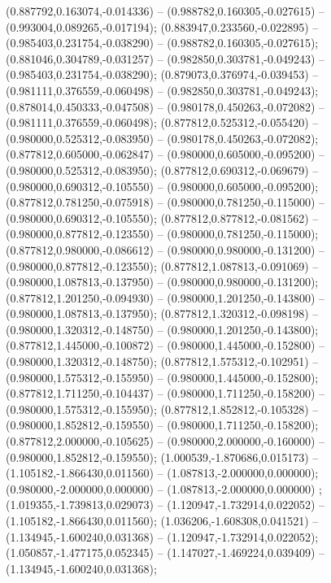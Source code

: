  (0.887792,0.163074,-0.014336) -- (0.988782,0.160305,-0.027615) -- (0.993004,0.089265,-0.017194);
 (0.883947,0.233560,-0.022895) -- (0.985403,0.231754,-0.038290) -- (0.988782,0.160305,-0.027615);
 (0.881046,0.304789,-0.031257) -- (0.982850,0.303781,-0.049243) -- (0.985403,0.231754,-0.038290);
 (0.879073,0.376974,-0.039453) -- (0.981111,0.376559,-0.060498) -- (0.982850,0.303781,-0.049243);
 (0.878014,0.450333,-0.047508) -- (0.980178,0.450263,-0.072082) -- (0.981111,0.376559,-0.060498);
 (0.877812,0.525312,-0.055420) -- (0.980000,0.525312,-0.083950) -- (0.980178,0.450263,-0.072082);
 (0.877812,0.605000,-0.062847) -- (0.980000,0.605000,-0.095200) -- (0.980000,0.525312,-0.083950);
 (0.877812,0.690312,-0.069679) -- (0.980000,0.690312,-0.105550) -- (0.980000,0.605000,-0.095200);
 (0.877812,0.781250,-0.075918) -- (0.980000,0.781250,-0.115000) -- (0.980000,0.690312,-0.105550);
 (0.877812,0.877812,-0.081562) -- (0.980000,0.877812,-0.123550) -- (0.980000,0.781250,-0.115000);
 (0.877812,0.980000,-0.086612) -- (0.980000,0.980000,-0.131200) -- (0.980000,0.877812,-0.123550);
 (0.877812,1.087813,-0.091069) -- (0.980000,1.087813,-0.137950) -- (0.980000,0.980000,-0.131200);
 (0.877812,1.201250,-0.094930) -- (0.980000,1.201250,-0.143800) -- (0.980000,1.087813,-0.137950);
 (0.877812,1.320312,-0.098198) -- (0.980000,1.320312,-0.148750) -- (0.980000,1.201250,-0.143800);
 (0.877812,1.445000,-0.100872) -- (0.980000,1.445000,-0.152800) -- (0.980000,1.320312,-0.148750);
 (0.877812,1.575312,-0.102951) -- (0.980000,1.575312,-0.155950) -- (0.980000,1.445000,-0.152800);
 (0.877812,1.711250,-0.104437) -- (0.980000,1.711250,-0.158200) -- (0.980000,1.575312,-0.155950);
 (0.877812,1.852812,-0.105328) -- (0.980000,1.852812,-0.159550) -- (0.980000,1.711250,-0.158200);
 (0.877812,2.000000,-0.105625) -- (0.980000,2.000000,-0.160000) -- (0.980000,1.852812,-0.159550);
 (1.000539,-1.870686,0.015173) -- (1.105182,-1.866430,0.011560) -- (1.087813,-2.000000,0.000000);
 (0.980000,-2.000000,0.000000) -- (1.087813,-2.000000,0.000000) ;
 (1.019355,-1.739813,0.029073) -- (1.120947,-1.732914,0.022052) -- (1.105182,-1.866430,0.011560);
 (1.036206,-1.608308,0.041521) -- (1.134945,-1.600240,0.031368) -- (1.120947,-1.732914,0.022052);
 (1.050857,-1.477175,0.052345) -- (1.147027,-1.469224,0.039409) -- (1.134945,-1.600240,0.031368);
